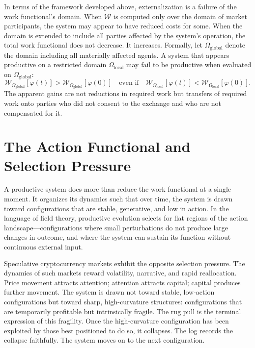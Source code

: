 \documentclass[12pt, oneside]{article}
\theoremstyle{definition}
\newcommand{\field}{\varphi}
\newcommand{\Wfunc}{\mathcal{W}}
\begin{document}
In terms of the framework developed above, externalization is a failure of the work functional's domain. When $\Wfunc$ is computed only over the domain of market participants, the system may appear to have reduced costs for some. When the domain is extended to include all parties affected by the system's operation, the total work functional does not decrease. It increases. Formally, let $\Omega_{\mathrm{global}}$ denote the domain including all materially affected agents. A system that appears productive on a restricted domain $\Omega_{\mathrm{local}}$ may fail to be productive when evaluated on $\Omega_{\mathrm{global}}$:
\[
  \Wfunc_{\Omega_{\mathrm{global}}}[\field(t)] > \Wfunc_{\Omega_{\mathrm{global}}}[\field(0)]
  \quad \text{even if} \quad
  \Wfunc_{\Omega_{\mathrm{local}}}[\field(t)] < \Wfunc_{\Omega_{\mathrm{local}}}[\field(0)].
\]
The apparent gains are not reductions in required work but transfers of required work onto parties who did not consent to the exchange and who are not compensated for it.

\section{The Action Functional and Selection Pressure}

A productive system does more than reduce the work functional at a single moment. It organizes its dynamics such that over time, the system is drawn toward configurations that are stable, generative, and low in action. In the language of field theory, productive evolution selects for flat regions of the action landscape---configurations where small perturbations do not produce large changes in outcome, and where the system can sustain its function without continuous external input.

Speculative cryptocurrency markets exhibit the opposite selection pressure. The dynamics of such markets reward volatility, narrative, and rapid reallocation. Price movement attracts attention; attention attracts capital; capital produces further movement. The system is drawn not toward stable, low-action configurations but toward sharp, high-curvature structures: configurations that are temporarily profitable but intrinsically fragile. The rug pull is the terminal expression of this fragility. Once the high-curvature configuration has been exploited by those best positioned to do so, it collapses. The log records the collapse faithfully. The system moves on to the next configuration.
\end{document}
